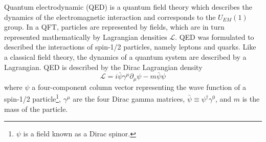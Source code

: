 Quantum electrodynamic (QED) is a quantum field theory which describes the dynamics of the electromagnetic interaction and corresponds to the $U_{EM}\left(1\right)$ group.
In a QFT, particles are represented by fields, which are in turn represented mathematically by Lagrangian densities $\mathcal{L}$.
QED was formulated to described the interactions of spin-1/2 particles, namely leptons and quarks.
Like a classical field theory, the dynamics of a quantum system are described by a Lagrangian.
QED is described by the Dirac Lagrangian density
\begin{equation}\label{eq:dirac_lagrangian_density}
\mathcal{L}=i\bar{\psi}\gamma^{\mu}\partial_{\mu}\psi-m\bar{\psi}\psi
\end{equation}
where $\psi$ a four-component column vector representing the wave function of a spin-1/2 particle\footnote{$\psi$ is a field known as a Dirac spinor.}, $\gamma^{\mu}$ are the four Dirac gamma matrices, $\bar{\psi}\equiv\psi^{\dagger}\gamma^{0}$, and $m$ is the mass of the particle.

